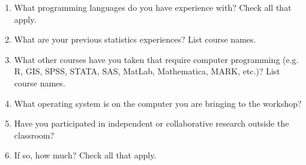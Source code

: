 \documentclass[12pt]{article}
\begin{document}
\begin{enumerate}
    \item What programming languages do you have experience with? Check all that apply.
        
    \item What are your previous statistics experiences? List course names.   
    
    \item What other courses have you taken that require computer programming (e.g. R, GIS, SPSS, STATA, SAS, MatLab, Mathematica, MARK, etc.)? List course names. 
    
    \item What operating system is on the computer you are bringing to the workshop?
        
    \item Have you participated in independent or collaborative research outside the classroom? 
        
    \item If so, how much? Check all that apply.
        

\end{enumerate}
\end{document}
